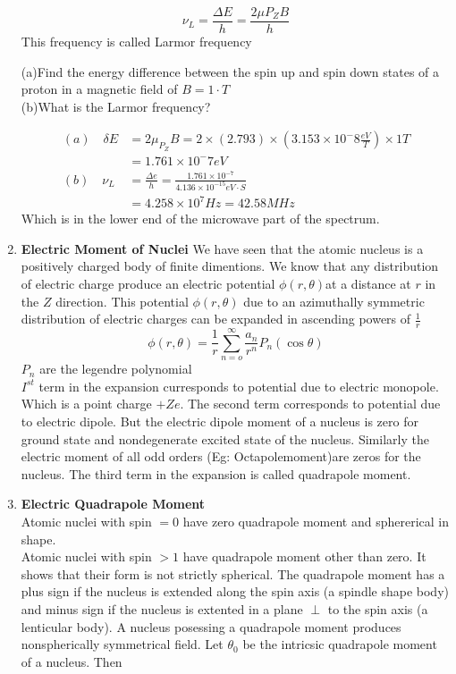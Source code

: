 \begin{enumerate}
\begin{note}
 	$$\nu_{L}=\frac{\Delta E}{h}=\frac{2 \mu P_{Z} B}{h}$$
 	This frequency is called Larmor frequency
\end{note}
\begin{exercise}
	 (a)\quad Find the energy difference between the spin up and spin down states of a proton in a magnetic field of $B=1\cdot T$ \\
	(b)\quad What is the Larmor frequency?
\end{exercise}
\begin{answer}
	\begin{align*}
	(a)\quad
	\delta E&=2\mu_{P_{Z}}B=2\times(2.793)\times \left(3.153\times10^-8\frac{eV}{T} \right) \times1T\\
	&=1.761\times10^-7 eV\\
	(b)\quad \nu_{L}&=\frac{\Delta e}{h}=\frac{1.761\times10^{-7}}{4.136\times10^{-15}eV\cdot S}\\
	&=4.258\times10^7Hz=42.58MHz
	\end{align*}
	Which is in the lower end of the microwave part of the spectrum.
\end{answer}
\item \textbf{Electric Moment of Nuclei}
We have seen that the atomic nucleus is a positively charged body of finite dimentions. We know that any distribution of electric charge produce an electric potential $\phi(r,\theta)$at a distance at $r$ in the $Z$ direction. This potential $\phi(r,\theta)$ due to an azimuthally symmetric distribution of electric charges can be expanded in ascending powers of $\frac{1}{r}$
$$\phi(r,\theta)=\frac{1}{r}\sum_{n=o}^{\infty}\frac{a_n}{r^n}P_n(\cos\theta)$$
$P_n$ are the legendre polynomial\\
$I^{st}$ term in the expansion curresponds to potential due to electric monopole. Which is a point charge $+Ze$. The second term corresponds to potential due to electric dipole. But the electric dipole moment of a nucleus is zero for ground state and nondegenerate excited state of the nucleus. Similarly the electric moment of all odd orders (Eg: Octapolemoment)are zeros for the nucleus. The third term in the expansion is called quadrapole moment.
\item \textbf{Electric Quadrapole Moment}\\
Atomic nuclei with spin $=0$ have zero quadrapole moment and sphererical in shape. \\
Atomic nuclei with spin $>1$ have quadrapole moment other than zero. It shows that their form is not strictly spherical. The quadrapole moment has a plus sign if the nucleus is  extended along  the spin axis (a spindle shape body) and minus sign if the nucleus is extented in a plane $\perp$ to the spin axis (a lenticular body). A nucleus posessing a quadrapole moment produces nonspherically symmetrical field. Let $\theta_0$ be the intricsic quadrapole moment of a nucleus. Then 

\end{enumerate}
